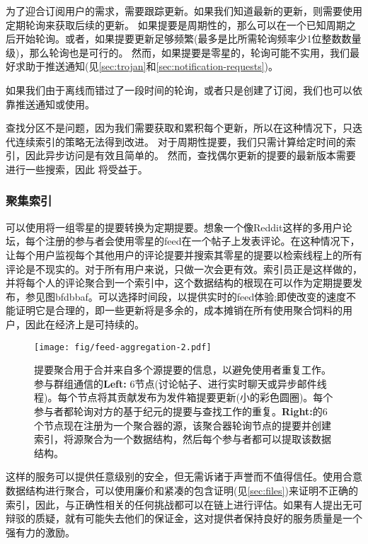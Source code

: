 为了迎合订阅用户的需求，需要跟踪更新。如果我们知道最新的更新，则需要使用定期轮询来获取后续的更新。
如果提要是周期性的，那么可以在一个已知周期之后开始轮询。或者，如果提要更新足够频繁(最多是比所需轮询频率少1位整数数量级)，那么轮询也是可行的。
然而，如果提要是零星的，轮询可能不实用，我们最好求助于推送通知(见\ref{sec:trojan}和\ref{sec:notification-requests})。

如果我们由于离线而错过了一段时间的轮询，或者只是创建了订阅，我们也可以依靠推送通知或使用。

查找分区不是问题，因为我们需要获取和累积每个更新，所以在这种情况下，只迭代连续索引的策略无法得到改进。
对于周期性提要，我们只需计算给定时间的索引，因此异步访问是有效且简单的。
然而，查找偶尔更新的提要的最新版本需要进行一些搜索，因此
将受益于。



\subsubsection{聚集索引}

可以使用将一组零星的提要转换为定期提要。想象一个像Reddit这样的多用户论坛，每个注册的参与者会使用零星的feed在一个帖子上发表评论。在这种情况下，让每个用户监视每个其他用户的评论提要并搜索其零星的提要以检索线程上的所有评论是不现实的。对于所有用户来说，只做一次会更有效。索引员正是这样做的，并将每个人的评论聚合到一个索引中，这个数据结构的根现在可以作为定期提要发布，参见图bfdbbaf。可以选择时间段，以提供实时的feed体验;即使改变的速度不能证明它是合理的，即一些更新将是多余的，成本摊销在所有使用聚合饲料的用户，因此在经济上是可持续的。 

\begin{figure}[htbp]
\centering
\texttt{[image: fig/feed-aggregation-2.pdf]}
\caption[提要聚合\statusyellow]{提要聚合用于合并来自多个源提要的信息，以避免使用者重复工作。参与群组通信的\textbf{Left:} 6节点(讨论帖子、进行实时聊天或异步邮件线程)。每个节点将其贡献发布为发件箱提要更新(小的彩色圆圈)。每个参与者都轮询对方的基于纪元的提要与查找工作的重复。\textbf{Right:}的6个节点现在注册为一个聚合器的源，该聚合器轮询节点的提要并创建索引，将源聚合为一个数据结构，然后每个参与者都可以提取该数据结构。}
\label{fig:feed-aggregation}
\end{figure}

这样的服务可以提供任意级别的安全，但无需诉诸于声誉而不值得信任。使用合意数据结构进行聚合，可以使用廉价和紧凑的包含证明(见\ref{sec:files})来证明不正确的索引，因此，与正确性相关的任何挑战都可以在链上进行评估。如果有人提出无可辩驳的质疑，就有可能失去他们的保证金，这对提供者保持良好的服务质量是一个强有力的激励。

